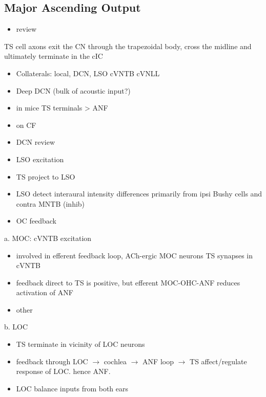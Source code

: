 \subsection{Major Ascending Output}
\label{sec-1_6}


\begin{itemize}
\item review \citep{DoucetRyugo:2006}
\end{itemize}

TS cell axons exit the CN through the trapezoidal body, cross the midline and ultimately terminate in the cIC \citep{Adams:1979}

\begin{itemize}
\item Collaterals: local, DCN, LSO cVNTB cVNLL \citep{Warr:1969,SmithJorisEtAl:1993,Thompson:1998,DoucetRyugo:2003}
\item Deep DCN (bulk of acoustic input?)
\item in mice TS terminals > ANF \citep{CaoMcGinleyEtAl:2008}
\item on CF \citep{SmithRhode:1989,FriedlandPongstapornEtAl:2003,DoucetRyugo:1997}
\item DCN review \citep{OertelYoung:2004}
\item LSO excitation
\item TS project to LSO \citep{Thompson:1998,DoucetRyugo:2003,ThompsonThompson:1991a}
\item LSO detect interaural intensity differences primarily from ipsi Bushy cells and contra MNTB (inhib)
\item OC feedback
\end{itemize}

a. MOC: cVNTB excitation 

\begin{itemize}
\item involved in efferent feedback loop, ACh-ergic MOC neurons TS synapses in cVNTB \citep{WarrBeck:1996,Warr:1992,Warr:1982,VeneciaLibermanEtAl:2005,ThompsonThompson:1991,SmithJorisEtAl:1993}
\item feedback direct to TS is positive, but efferent MOC-OHC-ANF reduces activation of ANF \citep{WarrenLiberman:1989,WiederholdKiang:1970}
\item other \citep{RobertsonMulders:2000,WinterRobertsonEtAl:1989}
\end{itemize}


b. LOC

\begin{itemize}
\item TS terminate in vicinity of LOC neurons \citep{Warr:1982,ThompsonThompson:1988,ThompsonThompson:1991,DoucetRyugo:2003}
\item feedback through LOC $\rightarrow$ cochlea $\rightarrow$ ANF loop $\rightarrow$ TS affect/regulate response of LOC. hence ANF.
\item LOC balance inputs from both ears \citep{DarrowMaisonEtAl:2006}
\end{itemize}

